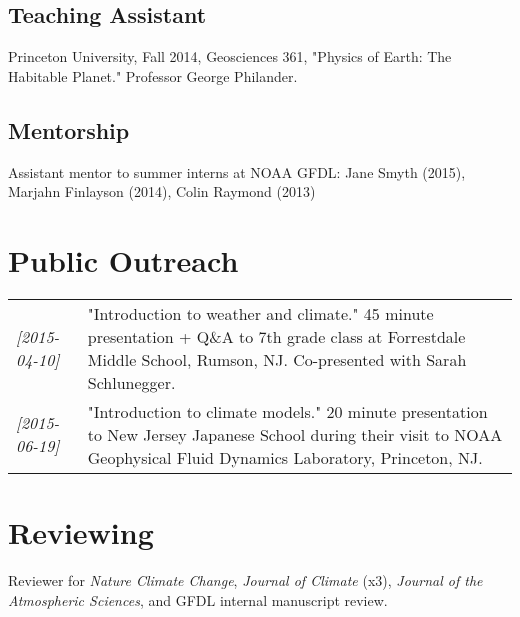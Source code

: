 \documentclass[12pt,letterpaper]{article}
\begin{document}
\subsection*{Teaching Assistant}
\label{sec:orgaac2025}
Princeton University, Fall 2014, Geosciences 361, "Physics of Earth: The
Habitable Planet."  Professor George Philander.
\subsection*{Mentorship}
\label{sec:org5491410}
Assistant mentor to summer interns at NOAA GFDL: Jane Smyth (2015), Marjahn
Finlayson (2014), Colin Raymond (2013)
\section*{Public Outreach}
\label{sec:orgfda2c16}
\begin{center}
\begin{tabularx}{\textwidth}{lX}
\textit{[2015-04-10]} & "Introduction to weather and climate."  45 minute presentation + Q\&A to 7th grade class at Forrestdale Middle School, Rumson, NJ.  Co-presented with Sarah Schlunegger.\\
\textit{[2015-06-19]} & "Introduction to climate models."  20 minute presentation to New Jersey Japanese School during their visit to NOAA Geophysical Fluid Dynamics Laboratory, Princeton, NJ.\\
\end{tabularx}
\end{center}
\section*{Reviewing}
\label{sec:orgb48b9ad}
Reviewer for \emph{Nature Climate Change}, \emph{Journal of Climate} (x3), \emph{Journal of the
Atmospheric Sciences}, and GFDL internal manuscript review.
\end{document}
